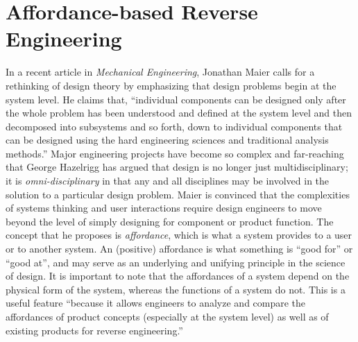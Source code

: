 \section{Affordance-based Reverse Engineering}

In a recent article in \textit{Mechanical Engineering}, Jonathan Maier
calls for a rethinking of design theory by emphasizing that design
problems begin at the system level. He claims that, “individual
components can be designed only after the whole problem has been
understood and defined at the system level and then decomposed into
subsystems and so forth, down to individual components that can be
designed using the hard engineering sciences and traditional analysis
methods.”\citep[pg. 34]{maier2008}\citep{maier2011} Major engineering projects have become so
complex and far-reaching that George Hazelrigg has argued that design
is no longer just multidisciplinary; it is \textit{omni-disciplinary}
in that any and all disciplines may be involved in the solution to a
particular design problem.\citep{hazelrigg1996} Maier is convinced that
the complexities of systems thinking and user interactions require
design engineers to move beyond the level of simply designing for
component or product function. The concept that he proposes is
\textit{affordance}, which is what a system provides to a user or to
another system. An (positive) affordance is what something is “good
for” or “good at”, and may serve as an underlying and unifying
principle in the science of design.\citep{maierfadel2001} It is important
to note that the affordances of a system depend on the physical form of
the system, whereas the functions of a system do not. This is a useful
feature “because it allows engineers to analyze and compare the
affordances of product concepts (especially at the system level) as
well as of existing products for reverse
engineering.”\citep[][pg. 36]{maier2008}

